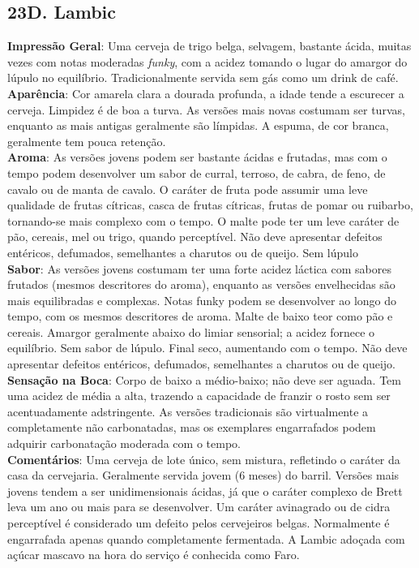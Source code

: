 \subsection*{23D. Lambic}
\textbf{Impressão Geral}: Uma cerveja de trigo belga, selvagem, bastante ácida, muitas vezes com notas moderadas \textit{funky}, com a acidez tomando o lugar do amargor do lúpulo no equilíbrio. Tradicionalmente servida sem gás como um drink de café. \\
\textbf{Aparência}: Cor amarela clara a dourada profunda, a idade tende a escurecer a cerveja. Limpidez é de boa a turva. As versões mais novas costumam ser turvas, enquanto as mais antigas geralmente são límpidas. A espuma, de cor branca, geralmente tem pouca retenção. \\
\textbf{Aroma}: As versões jovens podem ser bastante ácidas e frutadas, mas com o tempo podem desenvolver um sabor de curral, terroso, de cabra, de feno, de cavalo ou de manta de cavalo. O caráter de fruta pode assumir uma leve qualidade de frutas cítricas, casca de frutas cítricas, frutas de pomar ou ruibarbo, tornando-se mais complexo com o tempo. O malte pode ter um leve caráter de pão, cereais, mel ou trigo, quando perceptível. Não deve apresentar defeitos entéricos, defumados, semelhantes a charutos ou de queijo. Sem lúpulo \\
\textbf{Sabor}: As versões jovens costumam ter uma forte acidez láctica com sabores frutados (mesmos descritores do aroma), enquanto as versões envelhecidas são mais equilibradas e complexas. Notas funky podem se desenvolver ao longo do tempo, com os mesmos descritores de aroma. Malte de baixo teor como pão e cereais. Amargor geralmente abaixo do limiar sensorial; a acidez fornece o equilíbrio. Sem sabor de lúpulo. Final seco, aumentando com o tempo. Não deve apresentar defeitos entéricos, defumados, semelhantes a charutos ou de queijo. \\
\textbf{Sensação na Boca}: Corpo de baixo a médio-baixo; não deve ser aguada. Tem uma acidez de média a alta, trazendo a capacidade de franzir o rosto sem ser acentuadamente adstringente. As versões tradicionais são virtualmente a completamente não carbonatadas, mas os exemplares engarrafados podem adquirir carbonatação moderada com o tempo. \\
\textbf{Comentários}: Uma cerveja de lote único, sem mistura, refletindo o caráter da casa da cervejaria. Geralmente servida jovem (6 meses) do barril. Versões mais jovens tendem a ser unidimensionais ácidas, já que o caráter complexo de Brett leva um ano ou mais para se desenvolver. Um caráter avinagrado ou de cidra perceptível é considerado um defeito pelos cervejeiros belgas. Normalmente é engarrafada apenas quando completamente fermentada. A Lambic adoçada com açúcar mascavo na hora do serviço é conhecida como Faro. \\
